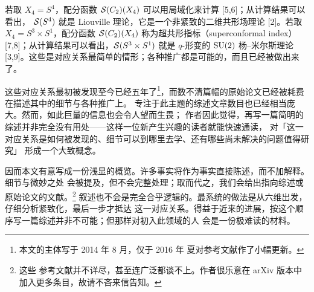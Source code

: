 若取 $X_4=S^4$，配分函数 $\mathcal{S}(C_2)(X_4)$ 可以用局域化来计算 [5,6]；从计算结果可以看出，
$\mathcal{S}(S^4)$ 就是 Liouville 理论，它是一个非紧致的二维共形场理论 [2]。若取
$X_4=S^3\times S^1$，配分函数 $\mathcal{S}(C_2)(X_4)$ 称为超共形指标（superconformal index）
[7,8]；从计算结果可以看出，$\mathcal{S}(S^3\times S^1)$ 就是 $q$-形变的 $\mathrm{SU}(2)$ 杨--米尔斯理论
[3,9]。这些是对应关系最简单的情形；各种推广都是可能的，而且已经被做出来了。



这些对应关系最初被发现至今已经五年了\footnote{本文的主体写于 2014 年 8 月，仅于 2016 年
夏对参考文献作了小幅更新。}，而数不清篇幅的原始论文已经被耗费在描述其中的细节与各种推广上。
专注于此主题的综述文章数目也已经相当庞大。然而，如此巨量的信息也会令人望而生畏；
作者因此觉得，再写一篇简明的综述并非完全没有用处——这样一位新产生兴趣的读者就能快速通读，
对「这一对应关系是如何被发现的、细节可以到哪里去学、还有哪些尚未解决的问题值得研究」
形成一个大致概念。


因而本文有意写成一份浅显的概览。许多事实将作为事实直接陈述，而不加解释。细节与微妙之处
会被提及，但不会完整处理；取而代之，我们会给出指向综述或原始论文的文献。\footnote{这些
参考文献并不详尽，甚至连广泛都谈不上。作者很乐意在 arXiv 版本中加入更多条目，故请不吝来信告知。}
叙述也不会是完全合乎逻辑的。最系统的做法是从六维出发，仔细分析紧致化，最后一步才抵达
这一对应关系。得益于近来的进展，按这个顺序写一篇综述并非不可能；但那样对初入此领域的人
会是一份极难读的材料。

